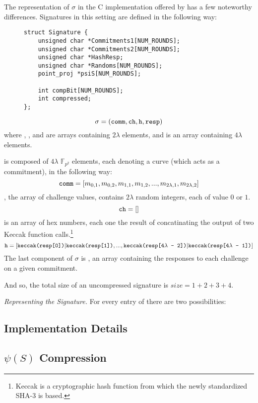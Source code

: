 The representation of $\sigma$ in the C implementation offered by \cite{yoo} has a few noteworthy differences. Signatures in this setting are defined in the following way:
\begin{figure}[!h]
\begin{lstlisting}
struct Signature {
	unsigned char *Commitments1[NUM_ROUNDS];
	unsigned char *Commitments2[NUM_ROUNDS];
	unsigned char *HashResp;
	unsigned char *Randoms[NUM_ROUNDS];
	point_proj *psiS[NUM_ROUNDS];

	int compBit[NUM_ROUNDS];
	int compressed;
};
\end{lstlisting}
\caption{\pbinv}
\label{code:sigstruct}
\end{figure}

$$
\sigma = (\texttt{comm}, \texttt{ch}, \texttt{h}, \texttt{resp})
$$
where , , and  are arrays containing $2\lambda$ elements, and  is an array containing $4\lambda$ elements. 

 is composed of $4\lambda$ $\mathbb{F}_{p^2}$ elements, each denoting a curve (which acts as a commitment), in the following way:
$$
\texttt{comm} = [m_{0, 1}, m_{0, 2}, m_{1, 1}, m_{1, 2}, ... , m_{2\lambda, 1}, m_{2\lambda, 2}]
$$
, the array of challenge values, contains $2\lambda$ random integers, each of value $0$ or $1$. 
$$
\texttt{ch} = []
$$
 is an array of hex numbers, each one the result of concatinating the output of two Keccak function calls.\footnote{Keccak is a cryptographic hash function from which the newly standardized SHA-3 is based.} 
$$
\texttt{h} = [\texttt{keccak(resp[0])}|\texttt{keccak(resp[1])}, ... , \texttt{keccak(resp[4}\lambda\texttt{ - 2])}|\texttt{keccak(resp[4}\lambda\texttt{ - 1])}]
$$
The last component of $\sigma$ is , an array containing the responses to each challenge on a given commitment. 

And so, the total size of an uncompressed signature is $size = 1 + 2 + 3 + 4$.

\textit{Representing the Signature.} For every entry of  there are two possibilities: 


\subsection{Implementation Details}

\subsection{$\psi(S)$ Compression}

